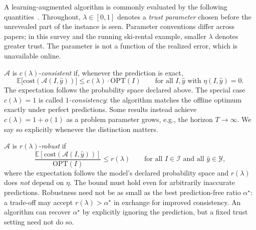 \documentclass[acmsmall,screen,nonacm]{acmart}
\theoremstyle{acmdefinition}%
\begin{document}
A learning-augmented algorithm is commonly evaluated by the following quantities~\cite{mitzenmacher2021algorithms}. Throughout, $\lambda \in [0,1]$ denotes a \emph{trust parameter} chosen before the unrevealed part of the instance is seen. Parameter conventions differ across papers; in this survey and the running ski-rental example, smaller $\lambda$ denotes greater trust. The parameter is not a function of the realized error, which is unavailable online.

\begin{definition}[Consistency]
\label{def:consistency}
$\mathcal{A}$ is $c(\lambda)$-\emph{consistent} if, whenever the prediction is exact,
\begin{equation}
    \mathbb{E}\big[\mathrm{cost}(\mathcal{A}(I, \hat{y}))\big] \leq c(\lambda) \cdot \mathrm{OPT}(I)
    \qquad \text{for all } I,\hat y \text{ with } \eta(I,\hat y) = 0.
    \label{eq_cons}
\end{equation}
The expectation follows the probability space declared above. The special case $c(\lambda) = 1$ is called \emph{$1$-consistency}: the algorithm matches the offline optimum exactly under perfect predictions. Some results instead achieve $c(\lambda) = 1 + o(1)$ as a problem parameter grows, e.g., the horizon $T \to \infty$. We say so explicitly whenever the distinction matters.
\end{definition}

\begin{definition}[Robustness]
\label{def:robustness}
$\mathcal{A}$ is $r(\lambda)$-\emph{robust} if
\begin{equation}
    \frac{\mathbb{E}[\mathrm{cost}(\mathcal{A}(I, \hat{y}))]}{\mathrm{OPT}(I)} \leq r(\lambda)
    \qquad \text{for all } I \in \mathcal{I} \text{ and all } \hat{y} \in \mathcal{Y},
    \label{eq_rob}
\end{equation}
where the expectation follows the model's declared probability space and $r(\lambda)$ does \emph{not} depend on $\eta$. The bound must hold even for arbitrarily inaccurate predictions. Robustness need not be as small as the best prediction-free ratio $\alpha^\star$: a trade-off may accept $r(\lambda)>\alpha^\star$ in exchange for improved consistency. An algorithm can recover $\alpha^\star$ by explicitly ignoring the prediction, but a fixed trust setting need not do so.
\end{definition}
\end{document}
